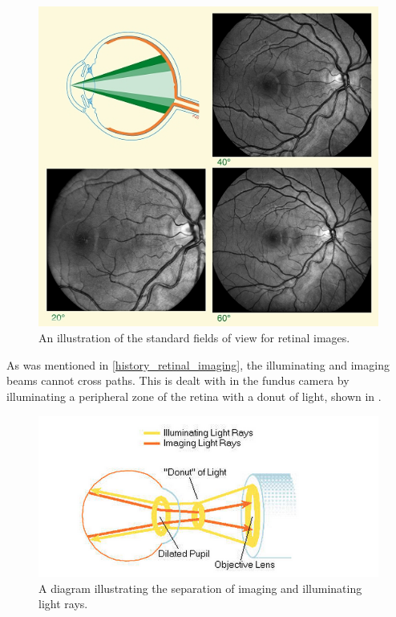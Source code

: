 \begin{figure}[H]
\centering
\includegraphics{figures/fieldofview}
\caption{An illustration of the standard fields of view for retinal images.\cite{saine2002ophthalmic}}
\label{fig:fov}
\end{figure}

As was mentioned in \cref{history_retinal_imaging}, the illuminating
and imaging beams cannot cross paths. This is dealt with in the fundus
camera by illuminating a peripheral zone of the retina with a donut of
light, shown in . 

\begin{figure}[H]
\centering
\includegraphics{figures/lightdonut}
\caption{A diagram illustrating the separation of imaging and illuminating light rays.\cite{saine2002ophthalmic}}
\label{fig:ld}
\end{figure}

